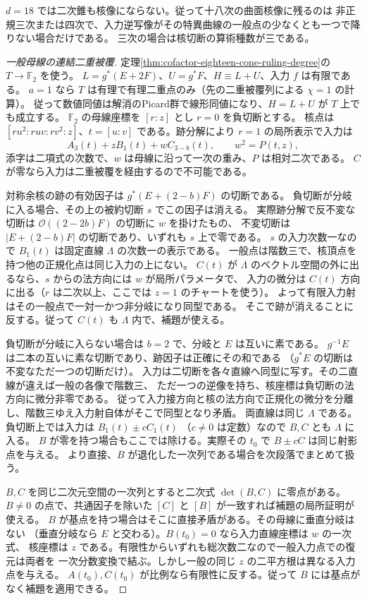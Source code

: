 \begin{theorem}\label{thm:cofactor-eighteen-no-quadric}
$d=18$ では二次錐も核像にならない。従って十八次の曲面核像に残るのは
非正規三次または四次で、入力逆写像がその特異曲線の一般点の少なくとも一つで降りない場合だけである。
三次の場合は核切断の算術種数が三である。
\end{theorem}
\begin{proof}[一般母線の連結二重被覆]
定理\ref{thm:cofactor-eighteen-cone-ruling-degree}の $T\to\mathbb F_2$ を使う。
$L=g^*(E+2F)$、$U=g^*F$、$H\equiv L+U$、入力 $f$ は有限である。
$a=1$ なら $T$ は有理で有理二重点のみ（先の二重被覆列による $\chi=1$ の計算）。
従って数値同値は解消のPicard群で線形同値になり、$H=L+U$ が $T$ 上でも成立する。
$\mathbb F_2$ の母線座標を $[r:z]$ とし $r=0$ を負切断とする。
核点は $[r u^2:r uv:r v^2:z]$、$t=[u:v]$ である。跡分解により
$r=1$ の局所表示で入力は
\[
        A_3(t)+zB_1(t)+w C_{3-b}(t),\qquad w^2=P(t,z),
\]
添字は二項式の次数で、$w$ は母線に沿って一次の重み、$P$ は相対二次である。
$C$ が零なら入力は二重被覆を経由するので不可能である。

対称余核の跡の有効因子は $g^*(E+(2-b)F)$ の切断である。
負切断が分岐に入る場合、その上の被約切断 $s$ でこの因子は消える。
実際跡分解で反不変な切断は $\mathcal O((2-2b)F)$ の切断に $w$ を掛けたもの、
不変切断は $|E+(2-b)F|$ の切断であり、いずれも $s$ 上で零である。
$s$ の入力次数一なので $B_1(t)$ は固定直線 $\Lambda$ の次数一の表示である。
一般点は階数三で、核頂点を持つ他の正規化点は同じ入力の上にない。
$C(t)$ が $\Lambda$ のベクトル空間の外に出るなら、$s$ からの法方向には $w$ が局所パラメータで、
入力の微分は $C(t)$ 方向に出る（$r$ は二次以上、ここでは $z=1$ のチャートを使う）。
よって有限入力射はその一般点で一対一かつ非分岐になり同型である。
そこで跡が消えることに反する。従って $C(t)$ も $\Lambda$ 内で、補題が使える。

負切断が分岐に入らない場合は $b=2$ で、分岐と $E$ は互いに素である。
$g^{-1}E$ は二本の互いに素な切断であり、跡因子は正確にその和である
（$g^*E$ の切断は不変なただ一つの切断だけ）。
入力は二切断を各々直線へ同型に写す。その二直線が違えば一般の各像で階数三、
ただ一つの逆像を持ち、核座標は負切断の法方向に微分非零である。
従って入力接方向と核の法方向で正規化の微分を分離し、階数三ゆえ入力射自体がそこで同型となり矛盾。
両直線は同じ $\Lambda$ である。負切断上では入力は $B_1(t)\pm c C_1(t)$
（$c\ne0$ は定数）なので $B,C$ とも $\Lambda$ に入る。
$B$ が零を持つ場合もここでは除ける。実際その $t_0$ で $B\pm cC$ は同じ射影点を与える。
より直接、$B$ が退化した一次列である場合を次段落でまとめて扱う。

$B,C$ を同じ二次元空間の一次列とすると二次式 $\det(B,C)$ に零点がある。
$B\ne0$ の点で、共通因子を除いた $[C]$ と $[B]$ が一致すれば補題の局所証明が使える。
$B$ が基点を持つ場合はそこに直接矛盾がある。その母線に垂直分岐はない
（垂直分岐なら $E$ と交わる）。$B(t_0)=0$ なら入力直線座標は $w$ の一次式、
核座標は $z$ である。有限性からいずれも総次数二なので一般入力点での復元は両者を
一次分数変換で結ぶ。しかし一般の同じ $z$ の二平方根は異なる入力点を与える。
$A(t_0),C(t_0)$ が比例なら有限性に反する。従って $B$ には基点がなく補題を適用できる。
\end{proof}

